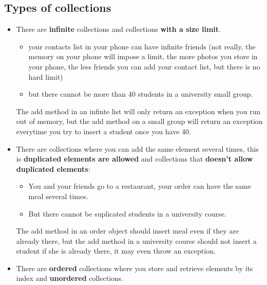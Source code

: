 \documentclass[a4paper, 9pt]{extarticle}
\begin{document}
\subsection{Types of collections}

\begin{itemize}

  \item There are \textbf{infinite} collections and collections \textbf{with a size limit}.

    \begin{itemize}

      \item your contacts list in your phone can have infinite friends (not really,
        the memory on your phone will impose a limit, the more photos you store in
        your phone, the less friends you can add your contact list, but there is
        no hard limit)

      \item but there cannot be more than 40 students in a university small group.

    \end{itemize}

    The add method in an infinte list will only return an exception when you
    run out of memory, but the add method on a small group will return an
    exception everytime you try to insert a student once you have 40.

  \item There are collections where you can add the same element several times,
    this is \textbf{duplicated elements are allowed} and collections that
    \textbf{doesn't allow duplicated elements}:

    \begin{itemize}

      \item You and your friends go to a restaurant, your order can have the same meal several times.

      \item But there cannot be suplicated students in a university course.

    \end{itemize}

    The add method in an order object should insert meal even if they are
    already there, but the add method in a university course should not insert
    a student if she is already there, it may even throw an exception.

  \item There are \textbf{ordered} collections where you store and retrieve elements by its index and \textbf{unordered} collections.


\end{itemize}
\end{document}
